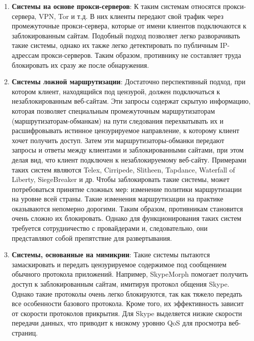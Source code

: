 \begin{enumerate}

    \item \textbf{Системы на основе прокси-серверов}: К таким системам относятся прокси-сервера, VPN, Tor и т.д.
    В них клиенты передают свой трафик через промежуточные прокси-сервера, которые от имени клиентов подключаются к заблокированным сайтам.
    Подобный подход позволяет легко разворачивать такие системы, однако их также легко детектировать по публичным IP-адрессам прокси-серверов.
    Таким образом, противнику не составляет труда блокировать их сразу же после обнаружения.

    \item \textbf{Системы ложной маршрутизации}:
    Достаточно перспективный подход, при котором клиент, находящийся под цензурой, должен подключаться к незаблокированным веб-сайтам.
    Эти запросы содержат скрытую информацию, которая позволяет специальным промежуточным маршрутизаторам
    (маршрутизаторам-обманкам) на пути следования перехватывать их и расшифровывать истинное цензурируемое направление, к которому клиент хочет получить доступ.
    Затем эти маршрутизаторы-обманки передают запросы и ответы между клиентами и заблокированными сайтами, при этом делая вид, что клиент подключен к незаблокируемому веб-сайту.
    Примерами таких систем являются Telex, Cirripede, Slitheen, Tapdance, Waterfall of Liberty, SiegeBreaker и др.
    Чтобы заблокировать такие системы, может потребоваться принятие сложных мер: изменение политики маршрутизации на уровне всей страны.
    Такие изменения маршрутизации на практике оказываются непомерно дорогими. Таким образом, противникам становится очень сложно их блокировать.
    Однако для функционирования таких систем требуется сотрудничество с провайдерами и, следовательно, они представляют собой препятствие для развертывания.

    \item \textbf{Системы, основанные на мимикрии}:
    Такие системы пытаются замаскировать и передать цензурируемое содержимое под сообщением обычного протокола приложений.
    Например, SkypeMorph помогает получить доступ к заблокированным сайтам, имитируя протокол общения Skype.
    Однако такие протоколы очень легко блокируются, так как тяжело передать все особенности базового протокола.
    Кроме того, их эффективность зависит от скорости протоколов прикрытия. Для Skype выделяется низкие скорости передачи данных,
    что приводит к низкому уровню QoS для просмотра веб-страниц.


\end{enumerate}

